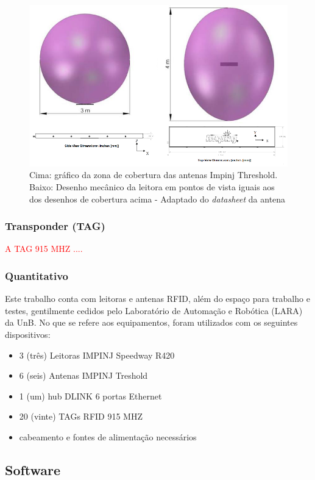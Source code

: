   \begin{figure}[H]
    \centering
    \includegraphics[width=0.6\linewidth]{figs/Metodologia/impinj_antenna_coverage.png}
    \caption{Cima: gráfico da zona de cobertura das antenas Impinj Threshold. Baixo: Desenho mecânico da leitora em pontos de vista iguais aos dos desenhos de cobertura acima - Adaptado do \textit{datasheet} da antena \cite{AntenaThresholdDatasheet}}
    \label{fig:AntenaThresholdCobertura}
\end{figure}

\subsubsection{Transponder (TAG)}

\textcolor{red}{A TAG 915 MHZ ....}
 
 \subsubsection{Quantitativo}
 
 Este trabalho conta com leitoras e antenas RFID, além do espaço para trabalho e testes, gentilmente cedidos pelo Laboratório de Automação e Robótica (LARA) da UnB. No que se refere aos equipamentos, foram utilizados com os seguintes dispositivos:
 
 \begin{itemize}
     \item 3 (três) Leitoras IMPINJ Speedway R420
     \item 6 (seis) Antenas IMPINJ Treshold
     \item 1 (um) hub DLINK 6 portas Ethernet
     \item 20 (vinte) TAGs RFID 915 MHZ
     \item cabeamento e fontes de alimentação necessários
 \end{itemize}
 
 \subsection{Software}
 
